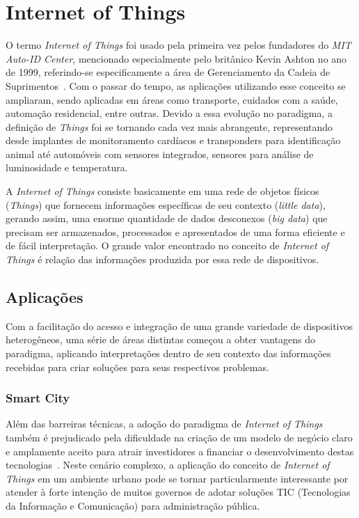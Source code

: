 \section{Internet of Things}
\label{sec:IoT}
O termo \textit{Internet of Things} foi usado pela primeira vez pelos fundadores do \textit{MIT Auto-ID Center},
mencionado especialmente pelo britânico Kevin Ashton no ano de 1999, referindo-se especificamente a área de
Gerenciamento da Cadeia de Suprimentos~\cite{kevinashton2009}. Com o passar do tempo, as aplicações utilizando
esse conceito se ampliaram, sendo aplicadas em áreas como transporte, cuidados com a saúde, automação residencial,
entre outras. Devido a essa evolução no paradigma, a definição de \textit{Things} foi se tornando cada vez mais
abrangente, representando desde implantes de monitoramento cardíacos e transponders para identificação animal
até automóveis com sensores integrados, sensores para análise de luminosidade e temperatura.

A \textit{Internet of Things} consiste basicamente em uma rede de objetos físicos (\textit{Things}) que fornecem
informações específicas de seu contexto (\textit{little data}), gerando assim, uma enorme quantidade de dados
desconexos (\textit{big data}) que precisam ser armazenados, processados e apresentados de uma forma eficiente
e de fácil interpretação. O grande valor encontrado no conceito de \textit{Internet of Things} é relação das
informações produzida por essa rede de dispositivos.

\subsection{Aplicações}
Com a facilitação do acesso e integração de uma grande variedade de dispositivos heterogêneos, uma série de
áreas distintas começou a obter vantagens do paradigma, aplicando interpretações dentro de seu contexto
das informações recebidas para criar soluções para seus respectivos problemas.

\label{sec:IoTAp}
\subsubsection{Smart City}
Além das barreiras técnicas, a adoção do paradigma de \textit{Internet of Things} também é prejudicado
pela dificuldade na criação de um modelo de negócio claro e amplamente aceito para atrair investidores
a financiar o desenvolvimento destas tecnologias~\cite{RePEc:zbw:itse13:88475}.
Neste cenário complexo, a aplicação do conceito de \textit{Internet of Things} em um ambiente urbano
pode se tornar particularmente interessante por atender à forte intenção de muitos governos de adotar
soluções TIC (Tecnologias da Informação e Comunicação) para administração pública.

